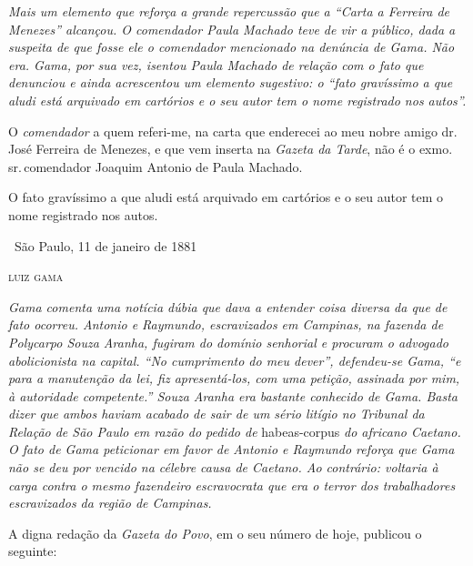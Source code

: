 {\begin{resumo}
\emph{Mais um elemento que reforça a grande repercussão que a ``Carta a
Ferreira de Menezes'' alcançou. O comendador Paula Machado teve de
vir a público, dada a suspeita de que fosse ele o comendador mencionado
na denúncia de Gama. Não era. Gama, por sua vez, isentou Paula Machado
de relação com o fato que denunciou e ainda acrescentou um elemento
sugestivo: o ``fato gravíssimo a que aludi está arquivado em cartórios e
o seu autor tem o nome registrado nos autos''. }
\end{resumo}

O \emph{comendador} a quem referi-me, na carta que enderecei ao meu
nobre amigo dr.\,José Ferreira de Menezes, e que vem inserta na
\emph{Gazeta da Tarde}, não é o exmo.\,sr.\,comendador Joaquim Antonio de
Paula Machado.

O fato gravíssimo a que aludi está arquivado em cartórios e o seu autor
tem o nome registrado nos autos.

\medskip

\hfill\ São Paulo, 11 de janeiro de 1881

\hfill\textsc{luiz gama}


\begin{resumo}
\emph{Gama comenta uma notícia dúbia que dava a entender coisa diversa
da que de fato ocorreu. Antonio e Raymundo, escravizados em Campinas, na
fazenda de Polycarpo Souza Aranha, fugiram do domínio senhorial e
procuram o advogado abolicionista na capital. ``No cumprimento do meu
dever'', defendeu-se Gama, ``e para a manutenção da lei, fiz
apresentá-los, com uma petição, assinada por mim, à autoridade
competente.'' Souza Aranha era bastante conhecido de Gama. Basta dizer
que ambos haviam acabado de sair de um sério litígio no Tribunal da
Relação de São Paulo em razão do pedido de} habeas-corpus \emph{do
africano Caetano. O fato de Gama peticionar em favor de Antonio e
Raymundo reforça que Gama não se deu por vencido na célebre causa de
Caetano. Ao contrário: voltaria à carga contra o mesmo fazendeiro
escravocrata que era o terror dos trabalhadores escravizados da região
de Campinas. }
\end{resumo}

A digna redação da \emph{Gazeta do Povo}, em o seu número de hoje,
publicou o seguinte:

}
